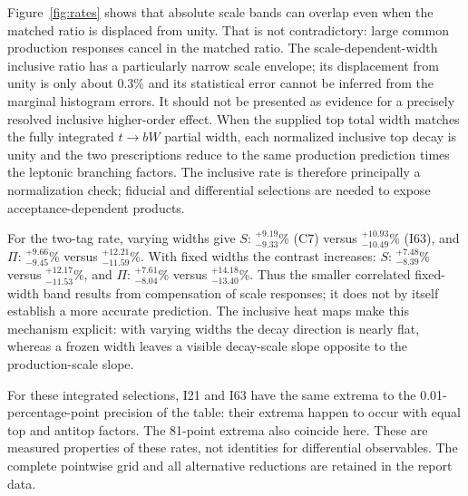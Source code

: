 \documentclass[11pt,a4paper]{article}
\begin{document}
Figure~\ref{fig:rates} shows that absolute scale bands can overlap even
when the matched ratio is displaced from unity. That is not contradictory:
large common production responses cancel in the matched ratio. The
scale-dependent-width inclusive ratio has a particularly narrow scale
envelope; its displacement from unity is only about $0.3$\% and its
statistical error cannot be inferred from the marginal histogram errors.
It should not be presented as evidence for a precisely resolved inclusive
higher-order effect.
When the supplied top total width matches the fully integrated
$t\to bW$ partial width, each normalized inclusive top decay is unity
and the two prescriptions reduce to the same production prediction times
the leptonic branching factors. The inclusive rate is therefore principally
a normalization check; fiducial and differential selections are needed to
expose acceptance-dependent products.

\begin{table}[htbp]\centering\small
\resizebox{.97\linewidth}{!}{}
\caption{Relative scale envelopes about each central rate, in percent.
C7 correlates production and decay renormalization scales; I21 separates
production and a common decay scale; I63 also allows independent top and
antitop factors. Full81 additionally restores the two extreme production
$\mu_R/\mu_F$ ratios. These are envelope prescriptions, not error
probabilities.}
\label{tab:scales}
\end{table}

For the two-tag rate, varying widths give
$S:\,{}^{+9.19}_{-9.33}$\% (C7) versus
${}^{+10.93}_{-10.49}$\% (I63), and
$\Pi:\,{}^{+9.66}_{-9.45}$\% versus
${}^{+12.21}_{-11.59}$\%. With fixed widths the contrast increases:
$S:\,{}^{+7.48}_{-8.39}$\% versus
${}^{+12.17}_{-11.53}$\%, and
$\Pi:\,{}^{+7.61}_{-8.04}$\% versus
${}^{+14.18}_{-13.40}$\%. Thus the smaller correlated fixed-width band
results from compensation of scale responses; it does not by itself
establish a more accurate prediction. The inclusive heat maps make this
mechanism explicit: with varying widths the decay direction is nearly
flat, whereas a frozen width leaves a visible decay-scale slope opposite
to the production-scale slope.

For these integrated selections, I21 and I63 have the same extrema to the
0.01-percentage-point precision of the table: their extrema happen to occur with equal top and
antitop factors. The 81-point extrema also coincide here. These are
measured properties of these rates, not identities for differential
observables. The complete pointwise grid and all alternative reductions
are retained in the report data.
\end{document}
